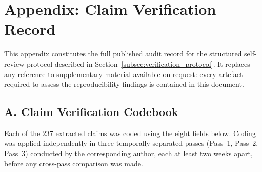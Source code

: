 \section*{Appendix: Claim Verification Record}
\label{sec:appendix}

This appendix constitutes the full published audit record for the structured
self-review protocol described in Section~\ref{subsec:verification_protocol}.
It replaces any reference to supplementary material available on request:
every artefact required to assess the reproducibility findings is contained
in this document.

\subsection*{A. Claim Verification Codebook}

Each of the 237 extracted claims was coded using the eight fields below.
Coding was applied independently in three temporally separated passes
(Pass~1, Pass~2, Pass~3) conducted by the corresponding author, each at
least two weeks apart, before any cross-pass comparison was made.

